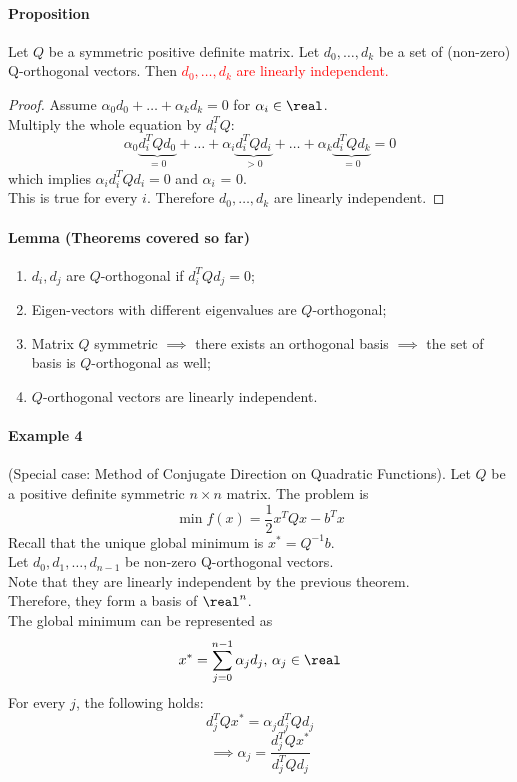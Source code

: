 \documentclass[11pt]{article}
\begin{document}
\paragraph{Proposition}
Let $Q$ be a symmetric positive definite matrix. Let $d_0, \hdots, d_k$ be a set of (non-zero) Q-orthogonal vectors. Then \textcolor{red}{$d_0, \hdots, d_k$ are linearly independent.} \\
\begin{proof}
	Assume $\alpha_0 d_0 + \hdots + \alpha_kd_k = 0$ for $\alpha_i \in \real$. \\
	Multiply the whole equation by $d_i^T Q$:
	$$\alpha_0 \underbrace{d_i^T Qd_0}_{=0} + \hdots + \alpha_i \underbrace{d_i^TQd_i}_{>0} + \hdots + \alpha_k \underbrace{d_i^T Qd_k}_{=0} = 0$$
	which implies $\alpha_i d_i^TQd_i = 0$ and $\alpha_i$ = 0. \\
	This is true for every $i$. Therefore $d_0, \hdots, d_k$ are linearly independent.
\end{proof}

\paragraph{Lemma (Theorems covered so far)}
\begin{enumerate}
	\item $d_i, d_j$ are $Q$-orthogonal if $d_i^TQd_j = 0$;
	\item Eigen-vectors with different eigenvalues are $Q$-orthogonal;
	\item Matrix $Q$ symmetric $\implies$ there exists an orthogonal basis $\implies$ the set of basis is $Q$-orthogonal as well;
	\item $Q$-orthogonal vectors are linearly independent.
\end{enumerate}

\paragraph{Example 4} (Special case: Method of Conjugate Direction on Quadratic Functions). Let $Q$ be a positive definite symmetric $n \times n$ matrix. The problem is
$$\min f(x) = \frac{1}{2}x^TQx - b^Tx$$
Recall that the unique global minimum is $x^* = Q^{-1}b$. \\
Let $d_0, d_1, \hdots, d_{n-1}$ be non-zero Q-orthogonal vectors. \\
Note that they are linearly independent by the previous theorem. \\
Therefore, they form a basis of $\real^n$. \\
The global minimum can be represented as 
$$x^* = \sum_{j=0}^{n-1} \alpha_j d_j, \, \alpha_j \in \real$$
For every $j$, the following holds:
$$d_j^TQx^* = \alpha_jd_j^TQd_j$$
$$\implies \alpha_j = \frac{d_j^TQx^*}{d_j^TQd_j}$$
\end{document}
